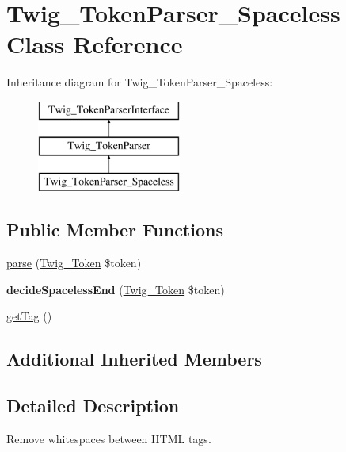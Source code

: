 \hypertarget{class_twig___token_parser___spaceless}{}\section{Twig\+\_\+\+Token\+Parser\+\_\+\+Spaceless Class Reference}
\label{class_twig___token_parser___spaceless}
Inheritance diagram for Twig\+\_\+\+Token\+Parser\+\_\+\+Spaceless\+:\begin{figure}[H]
\begin{center}
\leavevmode
\includegraphics[height=3.000000cm]{class_twig___token_parser___spaceless}
\end{center}
\end{figure}
\subsection*{Public Member Functions}
\begin{DoxyCompactItemize}
\item 
\hyperlink{class_twig___token_parser___spaceless_a5dfa2e269321584fb74e8b43dabe0efd}{parse} (\hyperlink{class_twig___token}{Twig\+\_\+\+Token} \$token)
\item 
\hypertarget{class_twig___token_parser___spaceless_a665a6235e646948edff10a0b0aaff059}{}{\bfseries decide\+Spaceless\+End} (\hyperlink{class_twig___token}{Twig\+\_\+\+Token} \$token)\label{class_twig___token_parser___spaceless_a665a6235e646948edff10a0b0aaff059}

\item 
\hyperlink{class_twig___token_parser___spaceless_ab86ba36154b20e6bbfa3ba705f12f9d6}{get\+Tag} ()
\end{DoxyCompactItemize}
\subsection*{Additional Inherited Members}


\subsection{Detailed Description}
Remove whitespaces between H\+T\+M\+L tags.


